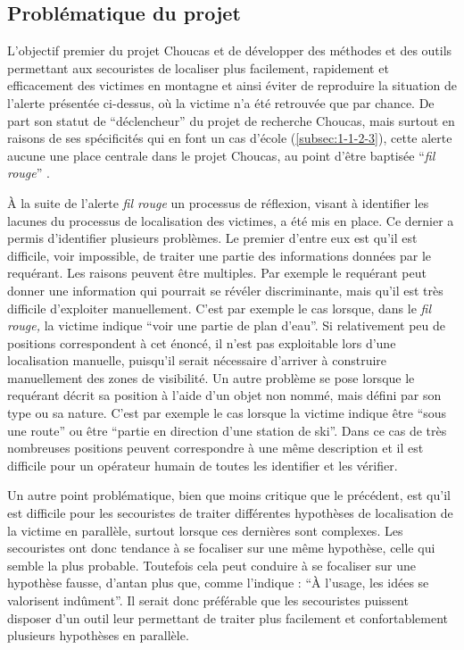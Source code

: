 \subsection{Problématique du projet}
\label{subsec:1-2-2}

L'objectif premier du projet Choucas et de développer des méthodes et
des outils permettant aux secouristes de localiser plus facilement,
rapidement et efficacement des victimes en montagne et ainsi éviter de
reproduire la situation de l'alerte présentée ci-dessus, où la victime
n'a été retrouvée que par chance. De part son statut de
\enquote{déclencheur} du projet de recherche Choucas, mais surtout en
raisons de ses spécificités qui en font un cas d'école
(\autoref{subsec:1-1-2-3}), cette alerte aucune une place centrale
dans le projet Choucas, au point d'être baptisée \enquote{\emph{fil
    rouge}} \autocite{OlteanuRaimond2017}.

À la suite de l'alerte \emph{fil rouge} un processus de réflexion,
visant à identifier les lacunes du processus de localisation des
victimes, a été mis en place. Ce dernier a permis d'identifier
plusieurs problèmes. Le premier d'entre eux est qu'il est difficile,
voir impossible, de traiter une partie des informations données par le
requérant. Les raisons peuvent être multiples. Par exemple le
requérant peut donner une information qui pourrait se révéler
discriminante, mais qu'il est très difficile d'exploiter
manuellement. C'est par exemple le cas lorsque, dans le \emph{fil
  rouge,} la victime indique \enquote{voir une partie de plan
  d'eau}. Si relativement peu de positions correspondent à cet énoncé,
il n'est pas exploitable lors d'une localisation manuelle, puisqu'il
serait nécessaire d'arriver à construire manuellement des zones de
visibilité. Un autre problème se pose lorsque le requérant décrit sa
position à l'aide d'un objet non nommé, mais défini par son type ou sa
nature. C'est par exemple le cas lorsque la victime indique être
\enquote{sous une route} ou être \enquote{partie \textelp{} en
  direction d'une station de ski}. Dans ce cas de très nombreuses
positions peuvent correspondre à une même description et il est
difficile pour un opérateur humain de toutes les identifier et les
vérifier.

Un autre point problématique, bien que moins critique que le
précédent, est qu'il est difficile pour les secouristes de traiter
différentes hypothèses de localisation de la victime en parallèle,
surtout lorsque ces dernières sont complexes. Les secouristes ont donc
tendance à se focaliser sur une même hypothèse, celle qui semble la
plus probable. Toutefois cela peut conduire à se focaliser sur une
hypothèse fausse, d’antan plus que, comme l'indique
\textcite{Bachelard1934} : \enquote{À l'usage, les idées se valorisent
  indûment}. Il serait donc préférable que les secouristes puissent
disposer d'un outil leur permettant de traiter plus facilement et
confortablement plusieurs hypothèses en parallèle.

